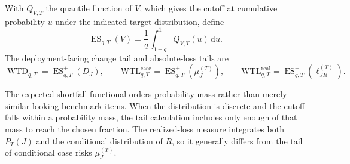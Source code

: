 \documentclass[12pt]{article}
\newcommand{\wtl}{\mathrm{WTL}}
\begin{document}
With \(Q_{V,T}\) the quantile function of \(V\), which gives the cutoff at cumulative probability \(u\) under the indicated target distribution, define
\[
\operatorname{ES}^{+}_{q,T}(V)
=\frac{1}{q}\int_{1-q}^{1}Q_{V,T}(u)\,\mathrm du.
\]
The deployment-facing change tail and absolute-loss tails are
\[
\operatorname{WTD}_{q,T}=\operatorname{ES}^{+}_{q,T}(D_J),
\qquad
\wtl^{\mathrm{case}}_{q,T}=\operatorname{ES}^{+}_{q,T}(\mu^{(T)}_J),
\qquad
\wtl^{\mathrm{real}}_{q,T}=\operatorname{ES}^{+}_{q,T}(\ell^{(T)}_{JR}).
\]

The expected-shortfall functional orders probability mass rather than merely similar-looking benchmark items. When the distribution is discrete and the cutoff falls within a probability mass, the tail calculation includes only enough of that mass to reach the chosen fraction. The realized-loss measure integrates both \(P_T(J)\) and the conditional distribution of \(R\), so it generally differs from the tail of conditional case risks \(\mu^{(T)}_J\).

\clearpage

\printbibliography
\end{document}
